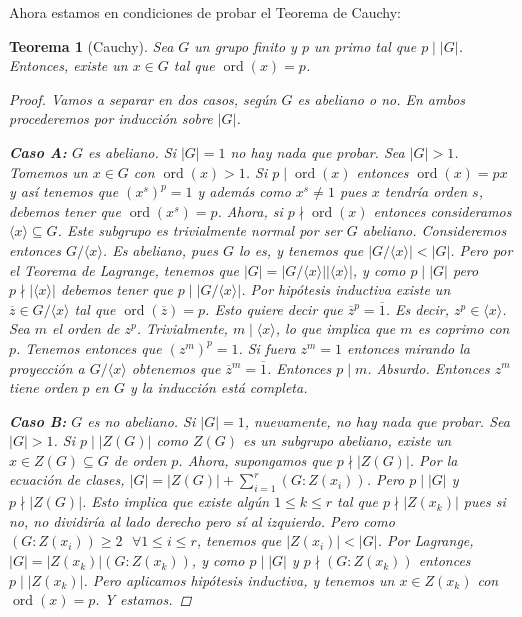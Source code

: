 \documentclass[12pt]{book}
\newtheorem{teo}{Teorema}[section]
\theoremstyle{definition}
\DeclareMathOperator{\ord}{ord}
\begin{document}
Ahora estamos en condiciones de probar el Teorema de Cauchy:
\begin{teo}[Cauchy]
Sea $G$ un grupo finito y $p$ un primo tal que $p\mid |G|$. Entonces, existe un $x\in G$ tal que $\ord (x)= p$.
\begin{proof}
Vamos a separar en dos casos, según $G$ es abeliano o no. En ambos procederemos por inducción sobre $|G|$.

\textbf{Caso A:} $G$ es abeliano. Si $|G|=1$ no hay nada que probar. Sea $|G|>1$. Tomemos un $x\in G$ con $\ord (x) > 1$. Si $p\mid \ord (x)$ entonces $\ord (x) = px$ y así tenemos que $(x^s)^p = 1$ y además como $x^s \neq 1$ pues $x$ tendría orden $s$, debemos tener que $\ord (x^s)=p$. Ahora, si $p\nmid \ord (x)$ entonces consideramos $\langle x\rangle \subseteq G$. Este subgrupo es trivialmente normal por ser $G$ abeliano. Consideremos entonces $G/\langle x\rangle$. Es abeliano, pues $G$ lo es, y tenemos que $|G/\langle x\rangle|<|G|$. Pero por el Teorema de Lagrange, tenemos que $|G| = |G/\langle x\rangle | |\langle x\rangle |$, y como $p\mid |G|$ pero $p\nmid |\langle x\rangle |$ debemos tener que $p\mid |G/\langle x\rangle |$. Por hipótesis inductiva existe un $\overline{z}\in G/\langle x\rangle$ tal que $\ord (\overline{z}) = p$. Esto quiere decir que $\overline{z}^p = \overline{1}$. Es decir, $z^p \in \langle x \rangle$. Sea $m$ el orden de $z^p$. Trivialmente, $m\mid \langle x\rangle$, lo que implica que $m$ es coprimo con $p$. Tenemos entonces que $(z^m)^p = 1$. Si fuera $z^m = 1$ entonces mirando la proyección a $G/\langle x\rangle$ obtenemos que $\overline{z}^m = \overline{1}$. Entonces $p\mid m$. Absurdo. Entonces $z^m$ tiene orden $p$ en $G$ y la inducción está completa.

\textbf{Caso B:} $G$ es no abeliano. Si $|G|=1$, nuevamente, no hay nada que probar. Sea $|G|>1$. Si $p\mid |Z(G)|$ como $Z(G)$ es un subgrupo abeliano, existe un $x\in Z(G)\subseteq G$ de orden $p$. Ahora, supongamos que $p\nmid |Z(G)|$. Por la ecuación de clases, $|G| = |Z(G)| + \displaystyle\sum_{i=1}^{r}(G:Z(x_i))$. Pero $p\mid |G|$ y $p\nmid |Z(G)|$. Esto implica que existe algún $1\leq k\leq r$ tal que $p\nmid |Z(x_k)|$ pues si no, no dividiría al lado derecho pero sí al izquierdo. Pero como $(G:Z(x_i))\geq 2 \text{ }\forall 1\leq i\leq r$, tenemos que $|Z(x_i)| < |G|$. Por Lagrange, $|G| = |Z(x_k)| (G:Z(x_k))$, y como $p\mid |G|$ y $p\nmid (G:Z(x_k))$ entonces $p\mid |Z(x_k)|$. Pero aplicamos hipótesis inductiva, y tenemos un $x\in Z(x_k)$ con $\ord (x) = p$. Y estamos.

\end{proof}
\end{teo}
\end{document}
